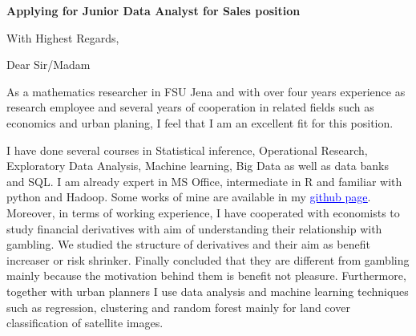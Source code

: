 \documentclass[12pt,a4paper,sans]{moderncv}        %
\title{}                               %
\begin{document}
\date{May 17, 2016}
\opening{\textbf{Applying for  Junior Data Analyst for Sales position}}
\closing{With Highest Regards,}
\makelettertitle

Dear Sir/Madam

As a mathematics researcher in FSU Jena and with over four years experience as research employee and several years of cooperation in related fields such as economics and urban planing, I feel that I am an excellent fit for this position.



I have done several courses in Statistical inference, Operational Research, Exploratory Data Analysis,  Machine learning, Big Data as well as data banks and SQL. I am already expert in MS Office, intermediate in R and familiar with python and Hadoop. Some works of mine are available in my  \href{https://github.com/srhumir}{\textcolor{blue}{\underline{github page}}}.
Moreover, in terms of working experience, I have cooperated with economists to study financial derivatives with aim of understanding their relationship with gambling. We studied the structure of derivatives and their aim as benefit increaser or risk shrinker. Finally concluded that they are different from gambling mainly because the motivation behind them is benefit not pleasure.   
Furthermore, together with urban planners I use data analysis and machine learning techniques such as regression, clustering and random forest mainly for land cover classification of satellite images.

\end{document}
